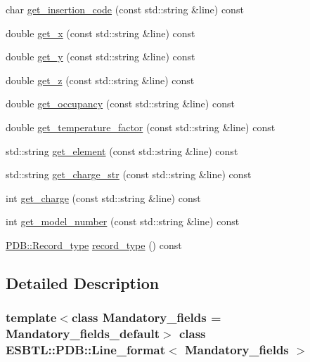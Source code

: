 \begin{DoxyCompactItemize}
\item 
char \hyperlink{classESBTL_1_1PDB_1_1Line__format_a13303838446368779d4b391ba130dcba}{get\+\_\+insertion\+\_\+code} (const std\+::string \&line) const
\item 
double \hyperlink{classESBTL_1_1PDB_1_1Line__format_afe06d4e9bcb00c28d4c4a7ba975d6f0b}{get\+\_\+x} (const std\+::string \&line) const
\item 
double \hyperlink{classESBTL_1_1PDB_1_1Line__format_a48f80ae039ee691802faa980fecb4476}{get\+\_\+y} (const std\+::string \&line) const
\item 
double \hyperlink{classESBTL_1_1PDB_1_1Line__format_a7d7e983d438a17bcd8a799baf6c06ab9}{get\+\_\+z} (const std\+::string \&line) const
\item 
double \hyperlink{classESBTL_1_1PDB_1_1Line__format_a7c2498989dd637f008a1719adb9b44b9}{get\+\_\+occupancy} (const std\+::string \&line) const
\item 
double \hyperlink{classESBTL_1_1PDB_1_1Line__format_afb1db7866fc6f7cc603ed5a9836100ad}{get\+\_\+temperature\+\_\+factor} (const std\+::string \&line) const
\item 
std\+::string \hyperlink{classESBTL_1_1PDB_1_1Line__format_ad38fda5e9c5d68d7da40356119f8537e}{get\+\_\+element} (const std\+::string \&line) const
\item 
std\+::string \hyperlink{classESBTL_1_1PDB_1_1Line__format_ada983c443ea270cc31d9337121ca4e58}{get\+\_\+charge\+\_\+str} (const std\+::string \&line) const
\item 
int \hyperlink{classESBTL_1_1PDB_1_1Line__format_a314acf4e8c390b306beb7fd917e0da31}{get\+\_\+charge} (const std\+::string \&line) const
\item 
int \hyperlink{classESBTL_1_1PDB_1_1Line__format_aa489ba8d76c6f289103da0466ce84e23}{get\+\_\+model\+\_\+number} (const std\+::string \&line) const
\item 
\hyperlink{namespaceESBTL_1_1PDB_a6f11e88f706f51afbe97230641a469b7}{P\+D\+B\+::\+Record\+\_\+type} \hyperlink{classESBTL_1_1PDB_1_1Line__format_ae266a9259dbd80a17d82e0dd42852fa3}{record\+\_\+type} () const
\end{DoxyCompactItemize}


\subsection{Detailed Description}
\subsubsection*{template$<$class Mandatory\+\_\+fields = Mandatory\+\_\+fields\+\_\+default$>$\newline
class E\+S\+B\+T\+L\+::\+P\+D\+B\+::\+Line\+\_\+format$<$ Mandatory\+\_\+fields $>$}

